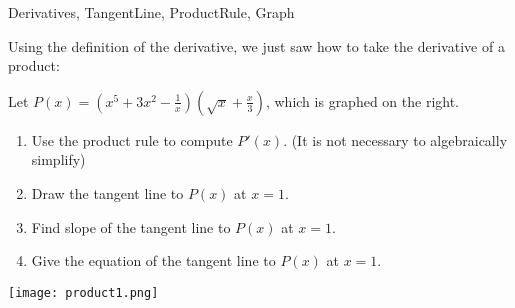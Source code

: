 
\begin{tagblock}{Derivatives, TangentLine, ProductRule, Graph}
\begin{question}
	




Using the definition of the derivative, we just saw how to take the derivative of a product:  
\bigskip



\noindent{}


\bigskip

Let $P(x) = (x^5+3x^2 - \frac{1}{x}) (\sqrt{x} + \frac{x}{3})$, which is graphed on the right.

 
\begin{minipage}{.6\textwidth}
\begin{enumerate}
\item  Use the product rule to compute $P'(x)$.  (It is not necessary to algebraically simplify) %
\item Draw the tangent line to $P(x)$ at $x=1$.  
\item    Find slope of the tangent line to $P(x)$ at $x=1$.  
\item Give the equation of the tangent line to $P(x)$ at $x=1$.  
\end{enumerate}
\end{minipage}%
\begin{minipage}{.4\textwidth}
\texttt{[image: product1.png]}
\end{minipage}












\end{question}
\end{tagblock}
